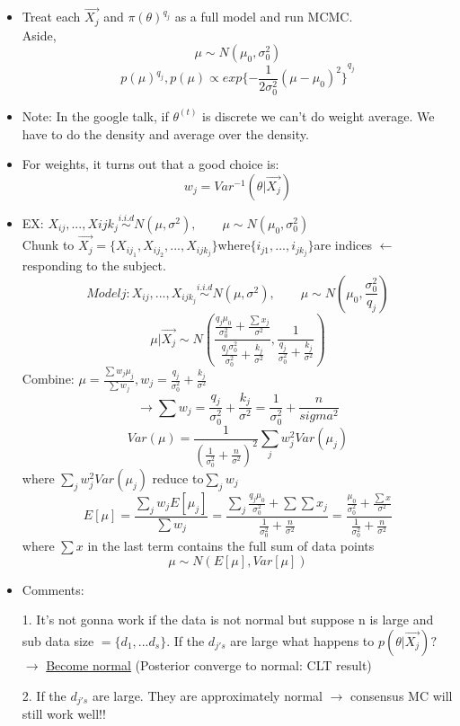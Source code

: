 \documentclass[11pt, oneside]{article}   	%
\begin{document}
\begin{itemize}
\item Treat each $\vec{X_j}$ and $  \pi(\theta)^{q_j} $ as a full model and run MCMC. \\
Aside, 
\[
\mu \sim N(\mu_0, \sigma_0^2)
\]
\[
p(\mu)^{q_j} ,
p(\mu) \propto exp {\{{-\frac{1}{2\sigma_0^2}{ (\mu-\mu_0)^2}\} }}^{q_j}  \]
\item Note: In the google talk, if $\theta^{(t)}$ is discrete we can't do weight average. We have to do the density and average over the density. \\
\item For weights, it turns out that a good choice is:\\
\[w_j = Var^{-1} (\theta|\vec{X_j}) \]
\item EX: $X_{ij}, ..., X{ijk_j} \stackrel{i.i.d}{\sim} N(\mu, \sigma^2), \qquad \mu \sim N(\mu_0, \sigma_0^2) $\\
Chunk to $ \vec{X_j} = \{ X_{ij_1}, X_{ij_2}, ..., X_{ijk_j} \} $where$  \{ i_{j1}, ..., i_{jk_j} \} $are indices $\leftarrow $responding to the subject. \\
\[
Model j : X_{ij}, ..., X_{ijk_j}  \stackrel{i.i.d}{\sim} N(\mu, \sigma^2), \qquad \mu \sim N(\mu_0, \frac{\sigma_0^2}{q_j})
\]
\[
\mu|\vec{X_j} \sim N(\frac{\frac{{q_j}{\mu_0}}{\sigma_0^2}+\frac{\sum{x_j}}{\sigma^2}}{\frac{{q_j}{\sigma_0^2}}{\sigma_0^2}+\frac{k_j}{\sigma^2}}, \frac{1}{\frac{q_j}{\sigma_0^2}+\frac{k_j}{\sigma^2}})
\]
Combine: $\mu = \frac{\sum{w_j}{\mu_j}}{\sum{w_j}}, w_j = \frac{q_j}{\sigma_0^2}+\frac{k_j}{\sigma^2}$\\
\[
\rightarrow \sum{w_j} =  \frac{q_j}{\sigma_0^2}+\frac{k_j}{\sigma^2} = \frac{1}{\sigma_0^2}+ \frac{n}{sigma^2}
\]
\[
Var(\mu) = \frac{1}{ (\frac{1}{\sigma_0^2}+\frac{n}{\sigma^2})^2} \sum_j{w_j^2}Var(\mu_j)
\]
where $ \sum_j{w_j^2}Var(\mu_j) $ reduce  to$ \sum_j{w_j}$\\
\[
E[\mu] = \frac{\sum_j{w_j}E[\mu_j]}{\sum{w_j}} = \frac{\sum_j{\frac{{q_j}{\mu_0}}{\sigma_0^2}}+{\sum\sum{x_j}}}{\frac{1}{\sigma_0^2}+\frac{n}{\sigma^2}} = \frac{\frac{\mu_0}{\sigma_0^2}+\frac{\sum{x}}{\sigma^2}}{\frac{1}{\sigma_0^2}+\frac{n}{\sigma^2}}
\]
where $\sum{x} $ in the last term contains the full sum of data points \\
\[
\mu \sim N( E[\mu], Var[\mu])
\]
\item Comments:
\end{itemize}
\begin{enumerate}
\item [1.] It's not gonna work if the data is not normal but suppose n is large and sub data size $ = \{d_1, ...d_s\} $. If the $d_{j's} $ are large what happens to $p(\theta|\vec{X_j}) ? $ \\
$\rightarrow $ \underline{Become normal} (Posterior converge to normal: CLT result) \\
\item [2.] If the $d_{j's}$ are large. They are approximately normal $\rightarrow$ consensus MC will still work well!! \\

\end{enumerate}
\end{document}
